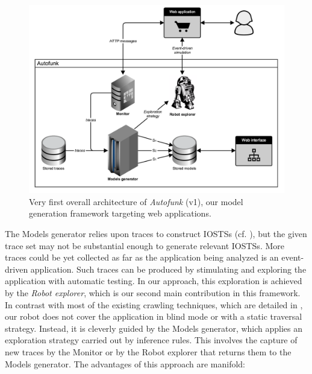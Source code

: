 \begin{figure}[ht]
    \begin{center}
        \includegraphics[width=1.0\linewidth]{figures/autofunk_v1_overview.png}
    \end{center}

    \caption{Very first overall architecture of \textit{Autofunk}
    (v1), our model generation framework targeting web applications.}
    \label{fig:soict-framework}
\end{figure}

The Models generator relies upon traces to construct IOSTSs (cf.
), but the given
trace set may not be substantial enough to generate relevant
IOSTSs. More traces could be yet collected as far as the
application being analyzed is an event-driven application. Such
traces can be produced by stimulating and exploring the
application with automatic testing. In our approach, this
exploration is achieved by the \textit{Robot explorer}, which is
our second main contribution in this framework. In contrast with
most of the existing crawling techniques, which are detailed in
, our robot does not
cover the application in blind mode or with a static traversal
strategy.  Instead, it is cleverly guided by the Models
generator, which applies an exploration strategy carried out by
inference rules.  This involves the capture of new traces by the
Monitor or by the Robot explorer that returns them to the Models
generator. The advantages of this approach are manifold:

